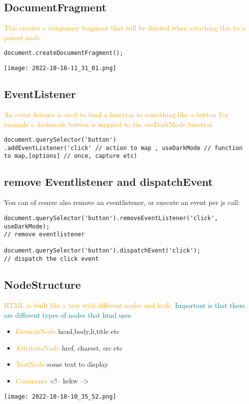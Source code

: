 \documentclass[main.tex,fontsize=6pt,paper=a4,paper=landscape,DIV=calc,]{scrartcl}
\begin{document}
\begin{multicols*}{4}
\subsection{DocumentFragment}  
\textcolor{orange}{This creates a temporary fragment that will be deleted when attaching this to a parent node.}
\vspace{-2mm}
\begin{lstlisting}
document.createDocumentFragment();
\end{lstlisting}
\vspace{2mm}
\texttt{[image: 2022-10-18-11\_31\_01.png]}

\subsection{EventListener}  
\textcolor{orange}{An event listener is used to bind a function to something like a button\newline
For example a darkmode button is mapped to the useDarkMode function}
\vspace{-2mm}
\begin{lstlisting}
document.querySelector('button')
.addEventListener('click' // action to map , useDarkMode // function to map,[options] // once, capture etc)
\end{lstlisting}
\vspace{2mm}


\subsection{remove Eventlistener and dispatchEvent}  
You can of course also remove an eventlistener, or execute an event per js call:
\vspace{-2mm}
\begin{lstlisting}
document.querySelector('button').removeEventListener('click', useDarkMode);
// remove eventlistener

document.querySelector('button').dispatchEvent('click');
// dispatch the click event
\end{lstlisting}
\vspace{2mm}

\subsection{NodeStructure}  
\textcolor{orange}{HTML is built like a tree with different nodes and leafs.}\newline
\textcolor{teal}{Important is that there are different types of nodes that html uses}
\begin{itemize}
  \item \textcolor{orange}{ElementNode} head,body,li,title etc
  \item \textcolor{orange}{AttributeNode} href, charset, src etc
  \item \textcolor{orange}{TextNode} some text to display
  \item \textcolor{orange}{Comments} <!-- kekw -->
\end{itemize}
\texttt{[image: 2022-10-18-10\_35\_52.png]}


\end{multicols*}
\end{document}
